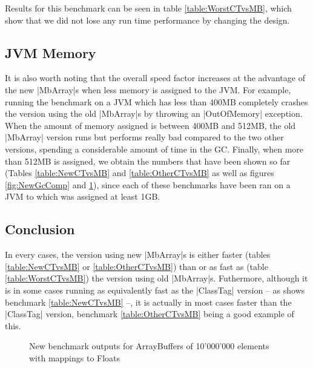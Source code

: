 Results for this benchmark can be seen in table \ref{table:WorstCTvsMB}, which show that we did not lose any run time performance by changing the design.

\subsection{JVM Memory}

It is also worth noting that the overall speed factor increases at the advantage of the new |MbArray|s when less memory is assigned to the JVM. For example, running the benchmark on a JVM which has less than 400MB completely crashes the version using the old |MbArray|s by throwing an |OutOfMemory| exception. When the amount of memory assigned is between 400MB and 512MB, the old |MbArray| version runs but performs really bad compared to the two other versions, spending a considerable amount of time in the GC. Finally, when more than 512MB is assigned, we obtain the numbers that have been shown so far (Tables \ref{table:NewCTvsMB} and \ref{table:OtherCTvsMB} as well as figures \ref{fig:NewGcComp} and \ref{fig:OtherGcComp}), since each of these benchmarks have been ran on a JVM to which was assigned at least 1GB.

\subsection{Conclusion}

In every cases, the version using new |MbArray|s is either faster (tables \ref{table:NewCTvsMB} or \ref{table:OtherCTvsMB}) than or as fast as (table \ref{table:WorstCTvsMB}) the version using old |MbArray|s. Futhermore, although it is in some cases running as equivalently fast as the |ClassTag| version -- as shows benchmark \ref{table:NewCTvsMB} --, it is actually in most cases faster than the |ClassTag| version, benchmark \ref{table:OtherCTvsMB} being a good example of this. 



\begin{figure}
\caption{New benchmark outputs for ArrayBuffers of 10'000'000 elements with mappings to Floats}
\label{fig:OtherGcComp}
\end{figure}